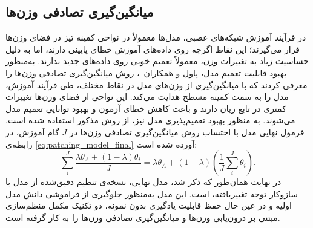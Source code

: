 \subsection{میانگین‌گیری تصادفی وزن‌ها}
در فرآیند آموزش شبکه‌های عصبی، مدل‌ها معمولاً در نواحی کمینه تیز در فضای وزن‌ها قرار می‌گیرند؛ این نقاط اگرچه روی داده‌های آموزش خطای پایینی دارند، اما به دلیل حساسیت زیاد به تغییرات وزن، معمولاً تعمیم خوبی روی داده‌های جدید ندارند. به‌منظور بهبود قابلیت تعمیم مدل، پاول و همکاران~\cite{flat-min}، روش میانگین‌گیری تصادفی وزن‌ها را معرفی کردند که با میانگین‌گیری از وزن‌های مدل در نقاط مختلف، طی فرآیند آموزش، مدل را به سمت کمینه مسطح هدایت می‌کند. این نواحی از فضای وزن‌ها تغییرات کمتری در تابع زیان دارند و باعث کاهش خطای آزمون و بهبود توانایی تعمیم مدل می‌شوند. به منظور بهبود تعمیم‌پذیری مدل  نیز، از روش مذکور استفاده شده است. فرمول نهایی مدل   با احتساب روش میانگین‌گیری تصادفی وزن‌ها در $J$ گام آموزش، در رابطه‌ی \eqref{eq:patching_model_final} آورده شده است:
\begin{equation}\label{eq:patching_model_final}
	\sum_{i}^{J} \frac{\lambda \theta_{A} + (1 - \lambda) \theta_{i}}{J}
	= \lambda \theta_{A} + (1 - \lambda)
	\left( \frac{1}{J} \sum_{i}^{J} \theta_{i} \right).
\end{equation}
در نهایت همان‌طور که ذکر شد، مدل  نهایی، نسخه‌ی تنظیم دقیق‌شده از مدل  با سازوکار توجه تغییر‌یافته، است. این مدل به‌منظور جلوگیری از فراموشی دانش مدل اولیه و در عین حال حفظ قابلیت یادگیری بدون نمونه، دو تکنیک مکمل منظم‌سازی مبتنی بر درون‌یابی وزن‌ها و میانگین‌گیری تصادفی وزن‌ها را به کار گرفته است.
